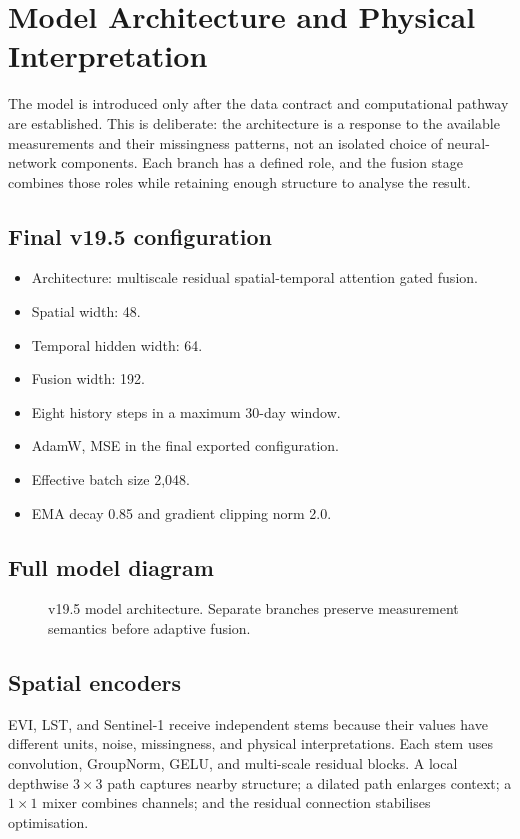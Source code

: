 \documentclass[12pt,a4paper]{report}
\begin{document}
\section{Model Architecture and Physical Interpretation}

The model is introduced only after the data contract and computational pathway
are established. This is deliberate: the architecture is a response to the
available measurements and their missingness patterns, not an isolated choice
of neural-network components. Each branch has a defined role, and the fusion
stage combines those roles while retaining enough structure to analyse the
result.

\subsection{Final v19.5 configuration}
\begin{itemize}
    \item Architecture: multiscale residual spatial-temporal attention gated fusion.
    \item Spatial width: 48.
    \item Temporal hidden width: 64.
    \item Fusion width: 192.
    \item Eight history steps in a maximum 30-day window.
    \item AdamW, MSE in the final exported configuration.
    \item Effective batch size 2,048.
    \item EMA decay 0.85 and gradient clipping norm 2.0.
\end{itemize}

\subsection{Full model diagram}
\begin{figure}[H]
\centering

\caption{v19.5 model architecture. Separate branches preserve measurement semantics before adaptive fusion.}
\end{figure}

\subsection{Spatial encoders}
EVI, LST, and Sentinel-1 receive independent stems because their values have
different units, noise, missingness, and physical interpretations. Each stem
uses convolution, GroupNorm, GELU, and multi-scale residual blocks. A local
depthwise $3\times3$ path captures nearby structure; a dilated path enlarges
context; a $1\times1$ mixer combines channels; and the residual connection
stabilises optimisation.
\end{document}
